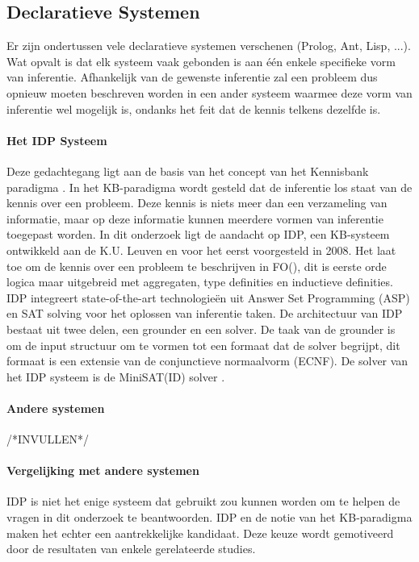 \subsection{Declaratieve Systemen}
Er zijn ondertussen vele declaratieve systemen verschenen (Prolog, Ant, Lisp, ...). Wat opvalt is dat elk systeem vaak gebonden is aan \'{e}\'{e}n enkele specifieke vorm van inferentie. Afhankelijk van de gewenste inferentie zal een probleem dus opnieuw moeten beschreven worden in een ander systeem waarmee deze vorm van inferentie wel mogelijk is, ondanks het feit dat de kennis telkens dezelfde is. 

\paragraph{Het IDP Systeem}
Deze gedachtegang ligt aan de basis van het concept van het Kennisbank paradigma \citep{denecker2008building}. In het KB-paradigma wordt gesteld dat de inferentie los staat van de kennis over een probleem. Deze kennis is niets meer dan een verzameling van informatie, maar op deze informatie kunnen meerdere vormen van inferentie toegepast worden. In dit onderzoek ligt de aandacht op IDP, een KB-systeem ontwikkeld aan de K.U. Leuven en voor het eerst voorgesteld in 2008. Het laat toe om de kennis over een probleem te beschrijven in FO(\textperiodcentered), dit is eerste orde logica maar uitgebreid met aggregaten, type definities en inductieve definities. IDP integreert state-of-the-art technologie\"{e}n uit Answer Set Programming (ASP) en SAT solving voor het oplossen van inferentie taken. De architectuur van IDP bestaat uit twee delen, een grounder en een solver. De taak van de grounder is om de input structuur om te vormen tot een formaat dat de solver begrijpt, dit formaat is een extensie van de conjunctieve normaalvorm (ECNF). De solver van het IDP systeem is de MiniSAT(ID) solver \citep{de2014minisat}.

\paragraph{Andere systemen}
/*INVULLEN*/

\paragraph{Vergelijking met andere systemen}
IDP is niet het enige systeem dat gebruikt zou kunnen worden om te helpen de vragen in dit onderzoek te beantwoorden. IDP en de notie van het KB-paradigma maken het echter een aantrekkelijke kandidaat. Deze keuze wordt gemotiveerd door de resultaten van enkele gerelateerde studies. 

